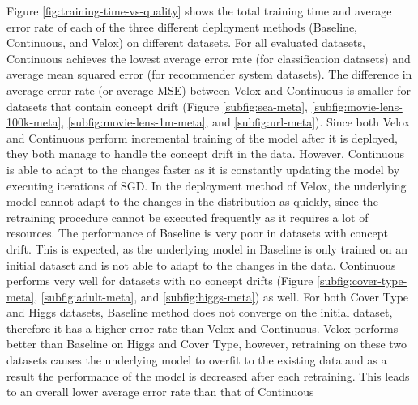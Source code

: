 \documentclass{vldb}
\begin{document}
Figure \ref{fig:training-time-vs-quality} shows the total training time and average error rate of each of the three different deployment methods (Baseline, Continuous, and Velox) on different datasets.
For all evaluated datasets, Continuous achieves the lowest average error rate (for classification datasets) and average mean squared error (for recommender system datasets).
The difference in average error rate (or average MSE) between Velox and Continuous is smaller for datasets that contain concept drift (Figure \ref{subfig:sea-meta}, \ref{subfig:movie-lens-100k-meta}, \ref{subfig:movie-lens-1m-meta}, and \ref{subfig:url-meta}).
Since both Velox and Continuous perform incremental training of the model after it is deployed, they both manage to handle the concept drift in the data.
However, Continuous is able to adapt to the changes faster as it is constantly updating the model by executing iterations of SGD.
In the deployment method of Velox, the underlying model cannot adapt to the changes in the distribution as quickly, since the retraining procedure cannot be executed frequently as it requires a lot of resources.
The performance of Baseline is very poor in datasets with concept drift.
This is expected, as the underlying model in Baseline is only trained on an initial dataset and is not able to adapt to the changes in the data.
Continuous performs very well for datasets with no concept drifts (Figure \ref{subfig:cover-type-meta},  \ref{subfig:adult-meta}, and \ref{subfig:higgs-meta}) as well.
For both Cover Type and Higgs datasets, Baseline method does not converge on the initial dataset, therefore it has a higher error rate than Velox and Continuous.
Velox performs better than Baseline on Higgs and Cover Type, however, retraining on these two datasets causes the underlying model to overfit to the existing data and as a result the performance of the model is decreased after each retraining.
This leads to an overall lower average error rate than that of Continuous
\end{document}
